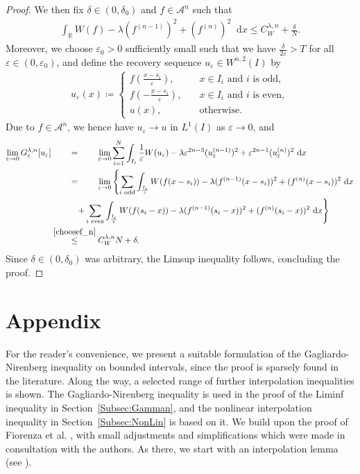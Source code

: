 \documentclass{article}
\newcommand{\dd}{\mathop{}\mathrm{d}} %
\newcommand{\lam}{\lambda}
\newcommand{\eps}{\varepsilon}
\numberwithin{figure}{section}
\def\AAA{{\mathcal A}} \def\calB{{\mathcal B}} \def\calC{{\mathcal C}}
\newcommand{\R}{\mathbb{R}}
\numberwithin{equation}{section}
\begin{document}
\begin{proof}
    \noindent We then fix $\delta \in (0,\delta_0)$ and $f \in \AAA^n$ such that 
    \begin{align} \label{choosef_n}
        \int_\R W(f)-\lam(f^{(n-1)})^2+(f^{(n)})^2\dd x \leq C^{\lam,n}_W + \frac{\delta}{N}.
    \end{align}    
     Moreover, we choose $\eps_0>0$ sufficiently small such that we have $\frac{\delta}{2\eps}>T$ for all $\eps \in (0,\eps_0)$, and define the recovery sequence $u_\eps \in W^{n,2}(I)$ by
    \begin{align}
        u_\eps(x)\coloneq 
        \left\{\begin{array}{ll}
        f\left(\frac{x-s_i}{\eps}\right), \quad & x \in I_i \text{ and $i$ is odd}, \\
        f\left(-\frac{x-s_i}{\eps}\right), \quad & x \in I_i \text{ and $i$ is even}, \\
        u(x), \quad & \text{otherwise}.
        \end{array}\right.
    \end{align}
    Due to $f \in \AAA^n$, we hence have $u_\eps \to u$ in $L^1(I)$ as $\eps \to 0$, and
        \begin{align}
            \lim_{\eps \to 0} G_\eps^{\lam,n}[u_\eps] 
            & \overset{\hphantom{\eqref{choosef_n}}}{=} \lim_{\eps \to 0} \sum_{i=1}^N \int_{I_i} \frac{1}{\eps} W(u_\eps) -\lam\eps^{2n-3}(u^{(n-1)}_\eps)^2+\eps^{2n-1}(u^{(n)}_\eps)^2\dd x \\
            &\overset{\hphantom{\eqref{choosef_n}}}{=} \lim_{\eps \to 0}\left\{\sum_{i \text{ odd}} \int_{\frac{I_i}{\eps}} W(f(x-s_i))-\lam(f^{(n-1)}(x-s_i))^2+(f^{(n)}(x-s_i))^2\dd x \right.\\
            & \qquad \quad + \! \left.\sum_{i \text{ even}} \int_{\frac{I_i}{\eps}} W(f(s_i-x))-\lam(f^{(n-1)}(s_i-x))^2+(f^{(n)}(s_i-x))^2\dd x\right\}\\
            & \overset{\eqref{choosef_n}}{\leq} C_W^{\lam,n} N + \delta.
        \end{align}
        Since $\delta \in (0,\delta_0)$ was arbitrary, the Limsup inequality follows, concluding the proof.
\end{proof}



\appendix

\section{Appendix}

For the reader's convenience, we present a suitable formulation of the Gagliardo-Nirenberg inequality \cite{Gag,Nir59} on bounded intervals, since the proof is sparsely found in the literature. Along the way, a selected range of further interpolation inequalities is shown. The Gagliardo-Nirenberg inequality is used in the proof of the Liminf inequality in Section~\ref{Subsec:Gamman}, and the nonlinear interpolation inequality in Section~\ref{Subsec:NonLin} is based on it. We build upon the proof of Fiorenza et al. \cite{FioForRosSou}, with small adjustments and simplifications which were made in consultation with the authors. As there, we start with an interpolation lemma (see \cite[Lemma~3.2]{FioForRosSou}).
\end{document}
